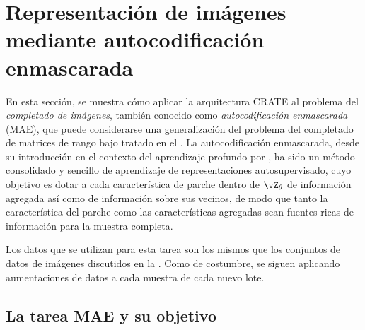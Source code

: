 \documentclass[../../book-main_es.tex]{subfiles}
\begin{document}
\section{Representación de imágenes mediante autocodificación enmascarada}\label{sec:image_completion}

En esta sección, se muestra cómo aplicar la arquitectura CRATE al
problema del \textit{completado de imágenes}, también conocido como \textit{autocodificación enmascarada} 
(MAE), que puede considerarse una generalización del
problema del completado de matrices de rango bajo tratado en el .
La autocodificación enmascarada, desde su introducción en el contexto del aprendizaje profundo
por \cite{he2022masked}, ha sido un método consolidado y sencillo
de aprendizaje de representaciones autosupervisado, cuyo objetivo es dotar
a cada característica de parche dentro de \(\vZ_{\theta}\) de información agregada
así como de información sobre sus vecinos, de modo que tanto la característica
del parche como las características agregadas sean fuentes ricas de información para
la muestra completa.

Los datos que se utilizan para esta tarea son los mismos que los conjuntos de datos de imágenes
discutidos en la . Como de costumbre, se siguen
aplicando aumentaciones de datos a cada muestra de cada nuevo lote.

\subsection{La tarea MAE y su objetivo}\label{sub:image_completion_objective}
\end{document}
